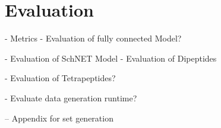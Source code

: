 \section{Evaluation}
\label{sec:evaluation}

- Metrics
- Evaluation of fully connected Model? 

- Evaluation of SchNET Model
- Evaluation of Dipeptides

- Evaluation of Tetrapeptides?

- Evaluate data generation runtime?

– Appendix for set generation
